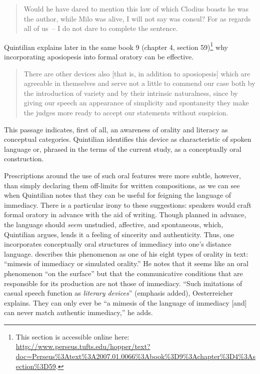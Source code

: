 \begin{quote}
Would he have dared to mention this law of which Clodius boasts he was the author, while Milo was alive, I will not say was consul? For as regards all of us~-- I do not dare to complete the sentence.
\end{quote}

\noindent Quintilian explains later in the same book 9 (chapter 4, section 59)\footnote{{This section is accessible online here:} \url{http://www.perseus.tufts.edu/hopper/text?doc=Perseus\%3Atext\%3A2007.01.0066\%3Abook\%3D9\%3Achapter\%3D4\%3Asection\%3D59}. } why incorporating aposiopesis into formal oratory can be effective.

\begin{quote}
There are other devices also [that is, in addition to aposiopesis] which are agreeable in themselves and serve not a little to commend our case both by the introduction of variety and by their intrinsic naturalness, since by giving our speech an appearance of simplicity and spontaneity they make the judges more ready to accept our statements without suspicion.
\end{quote}

\noindent This passage indicates, first of all, an awareness of  orality and literacy as conceptual categories. Quintilian identifies this device as characteristic of spoken language or, phrased in the terms of the current study, as a conceptually oral construction.

Prescriptions around the use of such oral features were more subtle, however, than simply declaring them off-limits for written compositions, as we can see when Quintilian notes that they can be useful for feigning the language of immediacy. There is a particular irony to these suggestions: speakers would craft formal oratory in advance with the aid of writing. Though planned in advance, the language should \textit{seem} unstudied, affective, and spontaneous, which, Quintilian argues, lends it a feeling of sincerity and authenticity. Thus, one incorporates conceptually oral structures of immediacy into one’s distance language. \citet[200, 205]{Oesterreicher1997} describes this phenomenon as one of his eight types of orality in text: “mimesis of immediacy or simulated orality.” He notes that it seems like an oral phenomenon “on the surface” but that the communicative conditions that are responsible for its production are not those of immediacy. “Such imitations of casual speech function as \textit{literary devices}” (emphasis added), Oesterreicher explains. They can only ever be “a mimesis of the language of immediacy [and] can never match authentic immediacy,” he adds.

